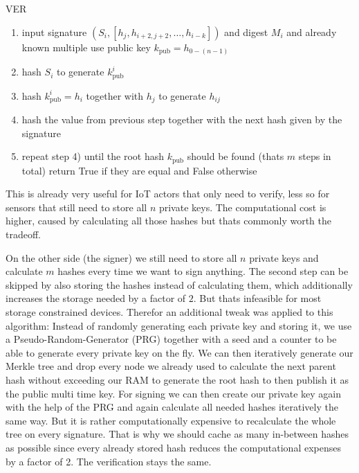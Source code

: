 \documentclass[conference]{IEEEtran}
\begin{document}
\begin{algorithm}
    \caption{VER}\label{Merkle ver v1}
        \begin{enumerate}
            \item input signature $(S_i,[h_{j},h_{i+2,j+2},\dots,h_{i-k}])$ and digest $M_i$ and already known multiple use public key $k_\text{pub}=h_{0-(n-1)}$
            \item hash $S_i$ to generate $k_\text{pub}^i$
            \item hash $k_\text{pub}^i=h_i$ together with $h_j$ to generate $h_{ij}$
            \item hash the value from previous step together with the next hash given by the signature
            \item repeat step 4) until the root hash $k_\text{pub}$ should be found (thats $m$ steps in total) return True if they are equal and False otherwise
        \end{enumerate}
    \end{algorithm}

This is already very useful for IoT actors that only need to verify, less so for sensors that still need to store all $n$ private keys. 
The computational cost is higher, caused by calculating all those hashes but thats commonly worth the tradeoff. 

On the other side (the signer) we still need to store all $n$ private keys and calculate $m$ hashes every time we want to sign anything.
The second step can be skipped by also storing the hashes instead of calculating them, which additionally increases the storage needed by a factor of $2$.
But thats infeasible for most storage constrained devices.
Therefor an additional tweak was applied to this algorithm:
Instead of randomly generating each private key and storing it, we use a Pseudo-Random-Generator (PRG) together with a seed and a counter to be able to generate every private key on the fly.
We can then iteratively generate our Merkle tree and drop every node we already used to calculate the next parent hash without exceeding our RAM to generate the root hash to then publish it as the public multi time key.
For signing we can then create our private key again with the help of the PRG and again calculate all needed hashes iteratively the same way. 
But it is rather computationally expensive to recalculate the whole tree on every signature. 
That is why we should cache as many in-between hashes as possible since every already stored hash reduces the computational expenses by a factor of 2.
The verification stays the same.
\end{document}
